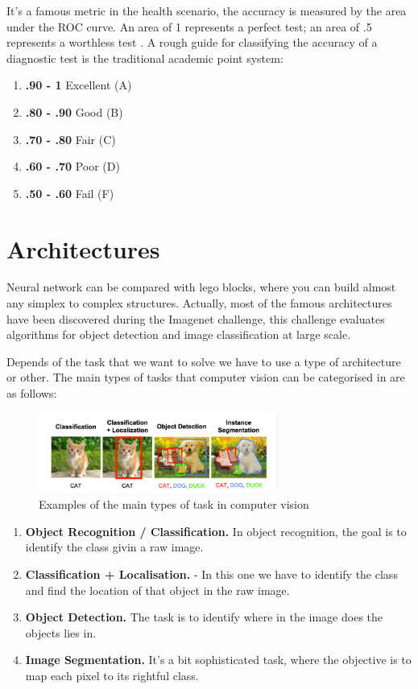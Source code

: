 It's a famous metric in the health scenario, the accuracy is measured by the area under the ROC curve. An area of 1 represents a perfect test; an area of .5 represents a worthless test \cite{area-roc-curve}. A rough guide for classifying the accuracy of a diagnostic test is the traditional academic point system:

\begin{enumerate}
\item \textbf{.90 - 1} Excellent (A)
\item \textbf{.80 - .90} Good (B)
\item \textbf{.70 - .80} Fair (C)
\item \textbf{.60 - .70} Poor (D)
\item \textbf{.50 - .60} Fail (F)
\end{enumerate}


\section[Architectures]{Architectures}

Neural network can be compared with lego blocks, where you can build almost any simplex to complex structures. Actually, most of the famous architectures have been discovered during the Imagenet challenge, this challenge evaluates algorithms for object detection and image classification at large scale\cite{architectures}.

Depends of the task that we want to solve we have to use a type of architecture or other. The main types of tasks that computer vision can be categorised in are as follows:


\begin{figure}[H]
\centering
\includegraphics[width=0.7\textwidth]{./figures/Tasks-Architectures}
\caption{Examples of the main types of task in computer vision \cite{architectures}}
\end{figure}

\begin{enumerate}
\item \textbf{Object Recognition / Classification.} In object recognition, the goal is to identify the class givin a raw image.
\item \textbf{Classification + Localisation.} - In this one we have to identify the class and find the location of that object in the raw image.
\item \textbf{Object Detection.} The task is to identify where in the image does the objects lies in. 
\item \textbf{Image Segmentation.} It's a bit sophisticated task, where the objective is to map each pixel to its rightful class.
\end{enumerate}

